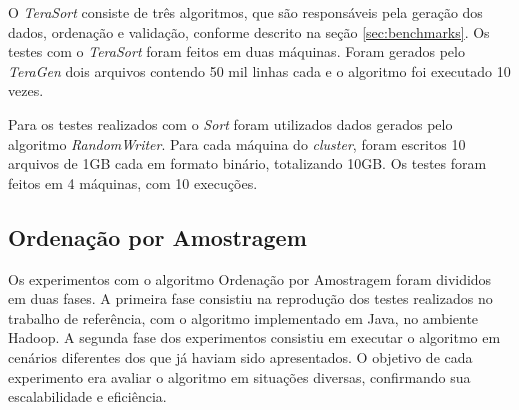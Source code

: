 
O \textit{TeraSort} consiste de três algoritmos, que são responsáveis pela geração dos dados, ordenação e validação, conforme descrito na seção \ref{sec:benchmarks}.
Os testes com o \textit{TeraSort} foram feitos em duas máquinas. Foram gerados pelo \textit{TeraGen} dois arquivos contendo 50 mil linhas cada e o algoritmo foi executado 10 vezes.

 



Para os testes realizados com o \textit{Sort} foram utilizados dados gerados pelo algoritmo \textit{RandomWriter}. Para cada máquina do \textit{cluster}, foram escritos 10 arquivos de 1GB cada em formato binário, totalizando 10GB. Os testes foram feitos em 4 máquinas, com 10 execuções. 


\subsection{Ordenação por Amostragem}

Os experimentos com o algoritmo Ordenação por Amostragem foram divididos em duas fases. A primeira fase consistiu na reprodução dos testes realizados no trabalho de referência, com o algoritmo implementado em Java, no ambiente Hadoop. A segunda fase dos experimentos consistiu em executar o algoritmo em cenários diferentes dos que já haviam sido apresentados. O objetivo de cada experimento era avaliar o algoritmo em situações diversas, confirmando sua escalabilidade e eficiência.

